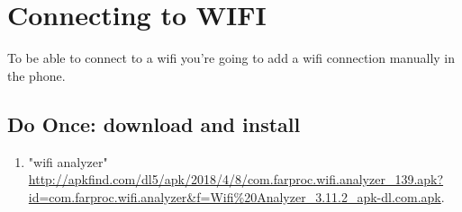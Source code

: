 \section{Connecting to WIFI}
To be able to connect to a wifi you're going to add a wifi connection manually in the phone. 

\subsection{Do Once: download and install}\label{subsec:wifi_once}
\begin{enumerate}
    \item "wifi analyzer" \url{http://apkfind.com/dl5/apk/2018/4/8/com.farproc.wifi.analyzer_139.apk?id=com.farproc.wifi.analyzer&f=Wifi%20Analyzer_3.11.2_apk-dl.com.apk}. 
    

\end{enumerate}
